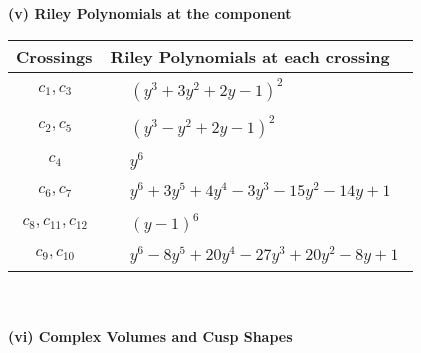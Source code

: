 \documentclass[1p]{elsarticle_modified}
\theoremstyle{definition}
\begin{document}
\newpage\renewcommand{\arraystretch}{1}
\flushleft \textbf{(v) Riley Polynomials at the component}\newline \\
\begin{tabular}{m{50pt}|m{274pt}}
Crossings & \hspace{64pt}Riley Polynomials at each crossing \\
\hline $$\begin{aligned}c_{1},c_{3}\end{aligned}$$&$\begin{aligned}
&(y^3+3 y^2+2 y-1)^2
\end{aligned}$\\
\hline $$\begin{aligned}c_{2},c_{5}\end{aligned}$$&$\begin{aligned}
&(y^3- y^2+2 y-1)^2
\end{aligned}$\\
\hline $$\begin{aligned}c_{4}\end{aligned}$$&$\begin{aligned}
&y^6
\end{aligned}$\\
\hline $$\begin{aligned}c_{6},c_{7}\end{aligned}$$&$\begin{aligned}
&y^6+3 y^5+4 y^4-3 y^3-15 y^2-14 y+1
\end{aligned}$\\
\hline $$\begin{aligned}c_{8},c_{11},c_{12}\end{aligned}$$&$\begin{aligned}
&(y-1)^6
\end{aligned}$\\
\hline $$\begin{aligned}c_{9},c_{10}\end{aligned}$$&$\begin{aligned}
&y^6-8 y^5+20 y^4-27 y^3+20 y^2-8 y+1
\end{aligned}$\\
\hline
\end{tabular}\\~\\
\newpage\flushleft \textbf{(vi) Complex Volumes and Cusp Shapes}
\end{document}
